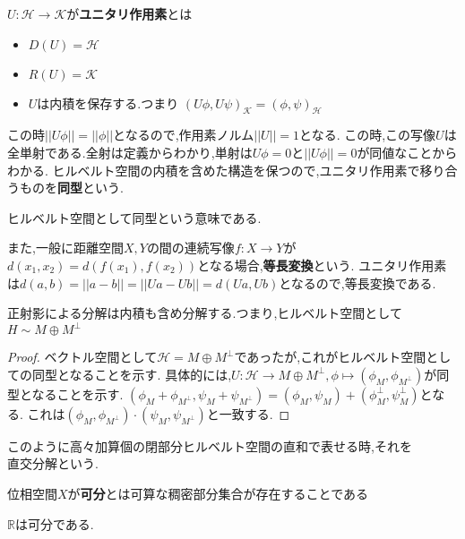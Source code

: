 \documentclass[uplatex]{jsbook}
\begin{document}
\begin{screen}
\begin{dfn}
  $U: \mathcal{H} \to \mathcal{K}$が\textbf{ユニタリ作用素}とは
\begin{itemize}
  \item $D(U) = \mathcal{H}$
  \item $R(U) = \mathcal{K}$
  \item $U$は内積を保存する.つまり
  $(U\phi, U\psi)_{\mathcal{K}} = (\phi, \psi)_{\mathcal{H}}$
\end{itemize}
\end{dfn}
\end{screen}
この時$||U\phi|| = ||\phi||$となるので,作用素ノルム$||U|| = 1$となる.
この時,この写像$U$は全単射である.全射は定義からわかり,単射は$U\phi =0$と$||U\phi||=0$が同値なことからわかる.
ヒルベルト空間の内積を含めた構造を保つので,ユニタリ作用素で移り合うものを\textbf{同型}という.
\begin{rem}
 ヒルベルト空間として同型という意味である.
\end{rem}
また,一般に距離空間$X,Y$の間の連続写像$f:X \to Y$が
$d(x_1, x_2) = d(f(x_1), f(x_2))$となる場合,\textbf{等長変換}という.
ユニタリ作用素は$d(a, b) = ||a - b|| = ||Ua -Ub|| = d(Ua, Ub)$となるので,等長変換である.

\begin{lem}
正射影による分解は内積も含め分解する.つまり,ヒルベルト空間として$H \sim M \oplus M^{\perp}$
\end{lem}
\begin{proof}
ベクトル空間として$\mathcal{H} = M \oplus M^{\perp}$であったが,これがヒルベルト空間としての同型となることを示す.
具体的には,$U: \mathcal{H} \to M \oplus M ^{\perp}, \phi \mapsto (\phi_M, \phi_{M ^{\perp}})$が同型となることを示す.
$(\phi_M + \phi_{M ^{\perp}}, \psi_M + \psi_{M  ^{\perp}}) = (\phi_M, \psi_M) + (\phi_M^{\perp}, \psi_M^{\perp})$となる.
これは$(\phi_M, \phi_{M ^{\perp}}) \cdot (\psi_M, \psi_{M^{\perp}})$と一致する.
\end{proof}

このように高々加算個の閉部分ヒルベルト空間の直和で表せる時,それを$\textbf{直交分解}$という.

\begin{screen}
\begin{dfn}
 位相空間$X$が\textbf{可分}とは可算な稠密部分集合が存在することである
\end{dfn}
\end{screen}

\begin{epl}
  $\mathbb{R}$は可分である.
\end{epl}
\end{document}
